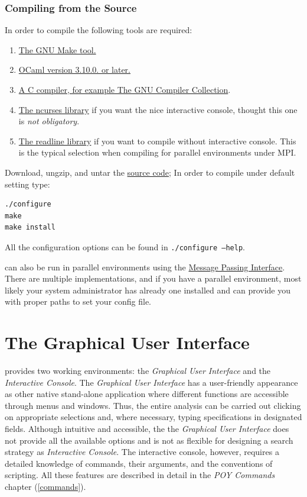 \subsubsection{Compiling from the Source}

In order to compile \poy the following tools are required:

\begin{enumerate}
    \item \href{http://www.gnu.org/software/make/}{The GNU Make tool.}
    \item \href{http://www.ocaml.org}{OCaml version 3.10.0. or later.}
    \item \href{http://gcc.gnu.org/}{A C compiler, for example The GNU Compiler Collection}.
    \item \href{http://www.gnu.org/software/ncurses/}{The ncurses library} if
        you want the nice interactive console, thought this one is
        \emph{not obligatory}.
    \item \href{http://tiswww.case.edu/php/chet/readline/rltop.html}{The
        readline library} if you want
        to compile \poy without interactive console. This is the typical
        selection when compiling \poy for parallel environments under MPI.
\end{enumerate}

Download, ungzip, and untar the
\href{http://research.amnh.org/scicomp/projects/poy.php}{\poy source code};
In order to compile under default setting type:
\begin{verbatim}
./configure
make
make install
\end{verbatim}
All the configuration options can be found in {\tt ./configure --help}.

\poy can also be run in parallel environments using the
\href{http://www-unix.mcs.anl.gov/mpi/}{Message Passing Interface}. There are
multiple implementations, and if you have a parallel environment, most likely
your system administrator has already one installed and can provide you with proper
paths to set your config file.

\section{The Graphical User Interface}

\poy provides two working environments: the \emph{Graphical User Interface} and the \emph{Interactive Console}.  The \emph{Graphical User Interface} has a user-friendly appearance as other native stand-alone application where different functions are accessible through menus and windows. Thus, the entire analysis can be carried out clicking on appropriate selections and, where necessary, typing specifications in designated fields. Although intuitive and accessible, the the \emph{Graphical User Interface} does not provide all the available options and is not as flexible for designing a search strategy as \emph{Interactive Console}. The interactive console, however, requires a detailed knowledge of \poy commands, their arguments, and the conventions of \poy scripting. All these features are described in detail in the \emph{POY Commands} chapter (\ref{commands}).

